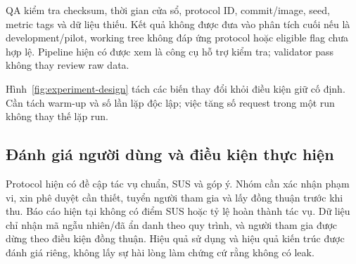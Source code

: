 QA kiểm tra checksum, thời gian cửa sổ, protocol ID, commit\slash image, seed, metric tags và dữ liệu thiếu. Kết quả không được đưa vào phân tích cuối nếu  là development\slash pilot, working tree không đáp ứng protocol hoặc eligible flag chưa hợp lệ. Pipeline hiện có được xem là công cụ hỗ trợ kiểm tra; validator pass không thay review raw data.

Hình~\ref{fig:experiment-design} tách các biến thay đổi khỏi điều kiện giữ cố định. Cần tách warm-up và số lần lặp độc lập; việc tăng số request trong một run không thay thế lặp run.


\subsection{Đánh giá người dùng và điều kiện thực hiện}
Protocol hiện có đề cập tác vụ chuẩn, SUS và góp ý. Nhóm cần xác nhận phạm vi, xin phê duyệt cần thiết, tuyển người tham gia và lấy đồng thuận trước khi thu. Báo cáo hiện tại không có điểm SUS hoặc tỷ lệ hoàn thành tác vụ. Dữ liệu chỉ nhận mã ngẫu nhiên\slash đã ẩn danh theo quy trình, và người tham gia được dừng theo điều kiện đồng thuận. Hiệu quả sử dụng và hiệu quả kiến trúc được đánh giá riêng, không lấy sự hài lòng làm chứng cứ rằng không có leak.
